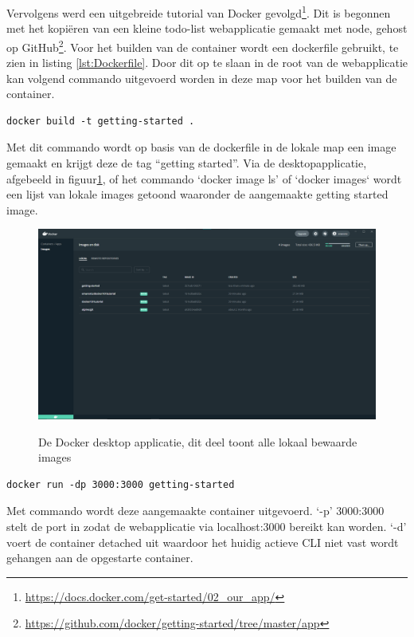 Vervolgens werd een uitgebreide tutorial van Docker gevolgd\footnote{\url{https://docs.docker.com/get-started/02_our_app/}}. Dit is begonnen met het kopiëren van een kleine todo-list webapplicatie gemaakt met node, gehost op GitHub\footnote{\url{https://github.com/docker/getting-started/tree/master/app}}. Voor het builden van de container wordt een dockerfile gebruikt, te zien in listing \ref{lst:Dockerfile}. Door dit op te slaan in de root van de webapplicatie kan volgend commando uitgevoerd worden in deze map voor het builden van de container.
\begin{verbatim}
docker build -t getting-started .
\end{verbatim}
Met dit commando wordt op basis van de dockerfile in de lokale map een image gemaakt en krijgt deze de tag “getting started”. Via de desktopapplicatie, afgebeeld in figuur\ref{fig:Dockerdesktop}, of het commando `docker image ls' of `docker images` wordt een lijst van lokale images getoond waaronder de aangemaakte getting started image.
\begin{figure}[h]
    \includegraphics[width=\linewidth]{img/dockerImg.png}
    \label{fig:Dockerdesktop}
    \caption[De Docker desktop applicatie]{De Docker desktop applicatie, dit deel toont alle lokaal bewaarde images}
    \centering
\end{figure}
\begin{verbatim}
docker run -dp 3000:3000 getting-started
\end{verbatim}
Met commando wordt deze aangemaakte container uitgevoerd. ‘-p’ 3000:3000 stelt de port in zodat de webapplicatie via localhost:3000 bereikt kan worden. ‘-d’ voert de container detached uit waardoor het huidig actieve CLI niet vast wordt gehangen aan de opgestarte container.

